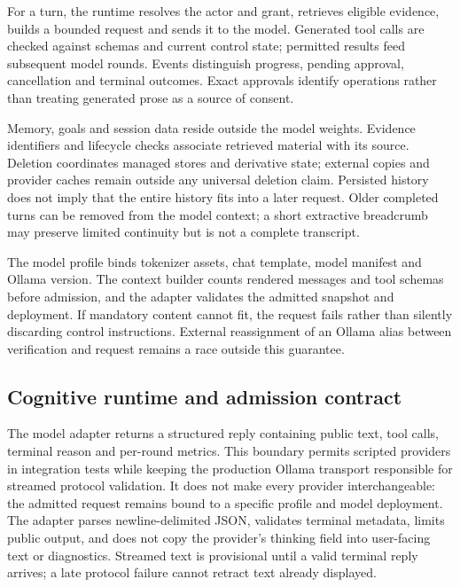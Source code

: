 \documentclass[11pt]{article}
\begin{document}
For a turn, the runtime resolves the actor and grant, retrieves eligible evidence, builds a bounded request and sends it to the model. Generated tool calls are checked against schemas and current control state; permitted results feed subsequent model rounds. Events distinguish progress, pending approval, cancellation and terminal outcomes. Exact approvals identify operations rather than treating generated prose as a source of consent.

Memory, goals and session data reside outside the model weights. Evidence identifiers and lifecycle checks associate retrieved material with its source. Deletion coordinates managed stores and derivative state; external copies and provider caches remain outside any universal deletion claim. Persisted history does not imply that the entire history fits into a later request. Older completed turns can be removed from the model context; a short extractive breadcrumb may preserve limited continuity but is not a complete transcript.

The model profile binds tokenizer assets, chat template, model manifest and Ollama version. The context builder counts rendered messages and tool schemas before admission, and the adapter validates the admitted snapshot and deployment. If mandatory content cannot fit, the request fails rather than silently discarding control instructions. External reassignment of an Ollama alias between verification and request remains a race outside this guarantee.

\subsection{Cognitive runtime and admission contract}
The model adapter returns a structured reply containing public text, tool calls, terminal reason and per-round metrics. This boundary permits scripted providers in integration tests while keeping the production Ollama transport responsible for streamed protocol validation. It does not make every provider interchangeable: the admitted request remains bound to a specific profile and model deployment. The adapter parses newline-delimited JSON, validates terminal metadata, limits public output, and does not copy the provider's thinking field into user-facing text or diagnostics. Streamed text is provisional until a valid terminal reply arrives; a late protocol failure cannot retract text already displayed.
\end{document}
